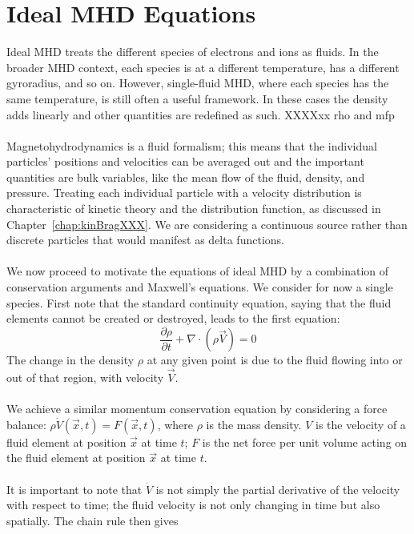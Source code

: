 \section{Ideal MHD Equations}
Ideal MHD treats the different species of electrons and ions as fluids. In the broader MHD context, each species is at a different temperature, has a different gyroradius, and so on. However, single-fluid MHD, where each species has the same temperature, is still often a useful framework. In these cases the density adds linearly and other quantities are redefined as such. XXXXxx
rho and mfp\\
\\
Magnetohydrodynamics is a fluid formalism; this means that the individual particles' positions and velocities can be averaged out and the important quantities are bulk variables, like the mean flow of the fluid, density, and pressure. Treating each individual particle with a velocity distribution is characteristic of kinetic theory and the distribution function, as discussed in Chapter~\ref{chap:kinBragXXX}. We are considering a continuous source rather than discrete particles that would manifest as delta functions. \\
\\
We now proceed to motivate the equations of ideal MHD by a combination of conservation arguments and Maxwell's equations. We consider for now a single species. First note that the standard continuity equation, saying that the fluid elements cannot be created or destroyed, leads to the first equation:
\begin{equation}
  \frac{\partial\rho}{\partial t}+\nabla\cdot\left(\rho\vec V\right)=0\label{eq:continuity}
\end{equation}
The change in the density $\rho$ at any given point is due to the fluid flowing into or out of that region, with velocity $\vec V$. \\
\\
We achieve a similar momentum conservation equation by considering a force balance: $\rho \dot V(\vec x,t)=F(\vec x,t)$, where $\rho$ is the mass density. $V$ is the velocity of a fluid element at position $\vec x$ at time $t$; $F$ is the net force per unit volume acting on the fluid element at position $\vec x$ at time $t$.\\
  \\
  It is important to note that $\dot V$ is not simply the partial derivative of the velocity with respect to time; the fluid velocity is not only changing in time but also spatially. The chain rule then gives
